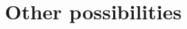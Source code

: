 \documentclass[letterpaper,12pt]{article}
\begin{document}



\section{Other possibilities}
\end{document}
